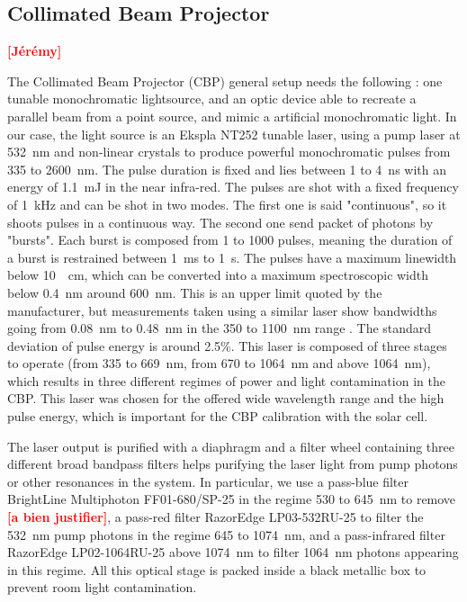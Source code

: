 \documentclass[onecolumn]{aa}
\newcommand{\todo}[1]{\textbf{\textcolor{red}{[#1]}}\xspace}
\begin{document}
\subsection{Collimated Beam Projector}
\label{sec:cbp}

\todo{Jérémy}

The Collimated Beam Projector (CBP) general setup needs the following : one tunable monochromatic lightsource, and an optic device able to recreate a parallel beam from a point source, and mimic a artificial monochromatic light. In our case, the light source is an Ekspla NT252 tunable laser, using a pump laser at \SI{532}{\nano\meter} and non-linear crystals to produce powerful monochromatic pulses from 335 to \SI{2600}{\nano\meter}. The pulse duration is fixed and lies between 1 to \SI{4}{\nano\second} with an energy of \SI{1.1}{\milli\joule} in the near infra-red. The pulses are shot with a fixed frequency of \SI{1}{\kilo\hertz} and can be shot in two modes. The first one is said "continuous", so it shoots pulses in a continuous way. The second one send packet of photons by "bursts". Each burst is composed from 1 to 1000 pulses, meaning the duration of a burst is restrained between \SI{1}{\milli\second} to \SI{1}{\second}. The pulses have a maximum linewidth below \SI{10}{\per\cm}, which can be converted into a maximum spectroscopic width below \SI{0.4}{\nano\meter} around \SI{600}{\nano\meter}. This is an upper limit quoted by the manufacturer, but measurements taken using a similar laser show bandwidths going from \SI{0.08}{\nm} to \SI{0.48}{\nm} in the 350 to \SI{1100}{\nm} range \citep{woodward2018}. The standard deviation of pulse energy is around 2.5\%. This laser is composed of three stages to operate (from 335 to \SI{669}{\nano\meter}, from 670 to \SI{1064}{\nano\meter} and above \SI{1064}{\nano\meter}), which results in three different regimes of power and light contamination in the CBP. This laser was chosen for the offered wide wavelength range and the high pulse energy, which is important for the CBP calibration with the solar cell. 

The laser output is purified with a diaphragm and a filter wheel containing three different broad bandpass filters helps purifying the laser light from pump photons or other resonances in the system. In particular, we use a pass-blue filter BrightLine Multiphoton FF01-680/SP-25 in the regime 530 to \SI{645}{\nano\meter} to remove \todo{a bien justifier}, a pass-red filter RazorEdge LP03-532RU-25 to filter the \SI{532}{\nano\meter} pump photons in the regime 645 to \SI{1074}{\nano\meter}, and a pass-infrared filter RazorEdge LP02-1064RU-25 above \SI{1074}{\nano\meter} to filter \SI{1064}{\nano\meter} photons appearing in this regime. All this optical stage is packed inside a black metallic box to prevent room light contamination.
\end{document}

